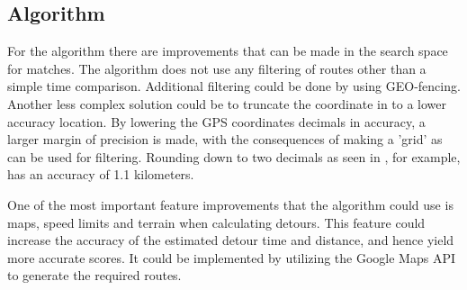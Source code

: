 \subsection{Algorithm}
For the algorithm there are improvements that can be made in the search space for matches.
The algorithm does not use any filtering of routes other than a simple time comparison.
Additional filtering could be done by using GEO-fencing.
Another less complex solution could be to truncate the coordinate in to a lower accuracy location.
By lowering the GPS coordinates decimals in accuracy, a larger margin of precision is made, with the consequences of making a 'grid' as can be used for filtering.
Rounding down to two decimals as seen in \cite{gpsdecimala}, for example, has an accuracy of 1.1 kilometers.

One of the most important feature improvements that the algorithm could use is maps, speed limits and terrain when calculating detours.
This feature could increase the accuracy of the estimated detour time and distance, and hence yield more accurate scores.
It could be implemented by utilizing the Google Maps API to generate the required routes.

